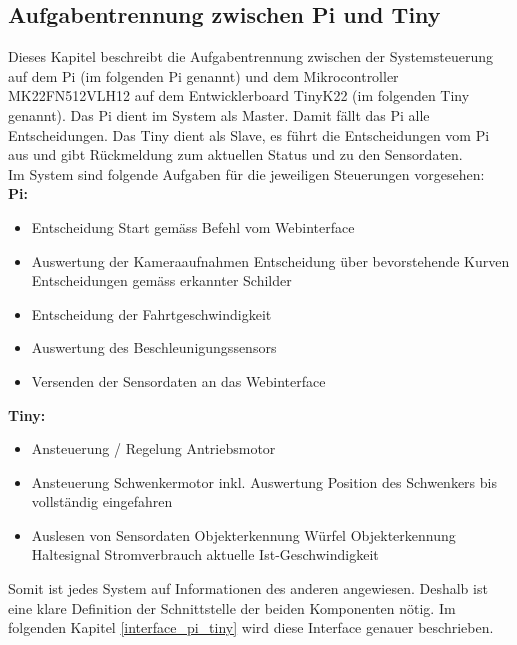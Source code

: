 \documentclass[../../main.tex]{subfiles}
\begin{document}
    \subsection{Aufgabentrennung zwischen Pi und Tiny} \label{aufgabentrennung_pi_tiny}
    Dieses Kapitel beschreibt die Aufgabentrennung zwischen der Systemsteuerung auf dem Pi (im folgenden Pi genannt) und dem Mikrocontroller MK22FN512VLH12 auf dem Entwicklerboard TinyK22 (im folgenden Tiny genannt). Das Pi dient im System als Master. Damit fällt das Pi alle Entscheidungen. Das Tiny dient als Slave, es führt die Entscheidungen vom Pi aus und gibt Rückmeldung zum aktuellen Status und zu den Sensordaten.\\
    Im System sind folgende Aufgaben für die jeweiligen Steuerungen vorgesehen:\\
    \textbf{Pi:}
    \begin{itemize}
        \item Entscheidung Start gemäss Befehl vom Webinterface
        \item Auswertung der Kameraaufnahmen
            \subitem Entscheidung über bevorstehende Kurven
            \subitem Entscheidungen gemäss erkannter Schilder
        \item Entscheidung der Fahrtgeschwindigkeit
        \item Auswertung des Beschleunigungssensors
        \item Versenden der Sensordaten an das Webinterface
    \end{itemize}

    \textbf{Tiny:}
    \begin{itemize}
        \item Ansteuerung / Regelung Antriebsmotor
        \item Ansteuerung Schwenkermotor
            \subitem inkl. Auswertung Position des Schwenkers bis vollständig eingefahren
        \item Auslesen von Sensordaten
            \subitem Objekterkennung Würfel
            \subitem Objekterkennung Haltesignal
            \subitem Stromverbrauch
            \subitem aktuelle Ist-Geschwindigkeit
    \end{itemize}

    Somit ist jedes System auf Informationen des anderen angewiesen. Deshalb ist eine klare Definition der Schnittstelle der beiden Komponenten nötig. Im folgenden Kapitel \ref{interface_pi_tiny} wird diese Interface genauer beschrieben.
\end{document}
